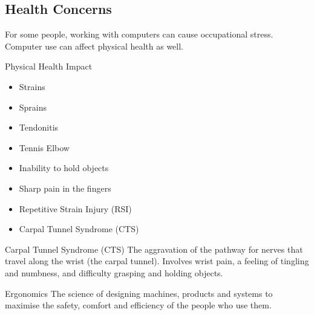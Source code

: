 \documentclass[\main/notes.tex]{subfiles}
\begin{document}
			\subsection{Health Concerns}
				For some people, working with computers can cause occupational stress. Computer use can affect physical health as well.
				\begin{sidenote}{Physical Health Impact}
					\begin{multicols}{2}
						\begin{itemize}[nosep]
							\item Strains
							\item Sprains
							\item Tendonitis
							\item Tennis Elbow
							\item Inability to hold objects
							\item Sharp pain in the fingers
							\item Repetitive Strain Injury (RSI)
							\item Carpal Tunnel Syndrome (CTS)
						\end{itemize}
					\end{multicols}
					\begin{definition}{Carpal Tunnel Syndrome (CTS)}
						The aggravation of the pathway for nerves that travel along the wrist (the carpal tunnel). Involves wrist pain, a feeling of tingling and numbness, and difficulty grasping and holding objects.
					\end{definition}
				\end{sidenote}
			\begin{definition}{Ergonomics}
				The science of designing machines, products and systems to maximise the safety, comfort and efficiency of the people who use them.
			\end{definition}

	\vbox{}
\end{document}
